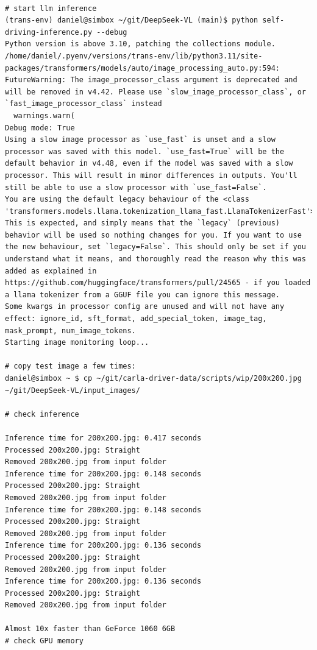 \begin{verbatim}

# start llm inference
(trans-env) daniel@simbox ~/git/DeepSeek-VL (main)$ python self-driving-inference.py --debug
Python version is above 3.10, patching the collections module.
/home/daniel/.pyenv/versions/trans-env/lib/python3.11/site-packages/transformers/models/auto/image_processing_auto.py:594: FutureWarning: The image_processor_class argument is deprecated and will be removed in v4.42. Please use `slow_image_processor_class`, or `fast_image_processor_class` instead
  warnings.warn(
Debug mode: True
Using a slow image processor as `use_fast` is unset and a slow processor was saved with this model. `use_fast=True` will be the default behavior in v4.48, even if the model was saved with a slow processor. This will result in minor differences in outputs. You'll still be able to use a slow processor with `use_fast=False`.
You are using the default legacy behaviour of the <class 'transformers.models.llama.tokenization_llama_fast.LlamaTokenizerFast'>. This is expected, and simply means that the `legacy` (previous) behavior will be used so nothing changes for you. If you want to use the new behaviour, set `legacy=False`. This should only be set if you understand what it means, and thoroughly read the reason why this was added as explained in https://github.com/huggingface/transformers/pull/24565 - if you loaded a llama tokenizer from a GGUF file you can ignore this message.
Some kwargs in processor config are unused and will not have any effect: ignore_id, sft_format, add_special_token, image_tag, mask_prompt, num_image_tokens. 
Starting image monitoring loop...

# copy test image a few times:
daniel@simbox ~ $ cp ~/git/carla-driver-data/scripts/wip/200x200.jpg ~/git/DeepSeek-VL/input_images/

# check inference

Inference time for 200x200.jpg: 0.417 seconds
Processed 200x200.jpg: Straight
Removed 200x200.jpg from input folder
Inference time for 200x200.jpg: 0.148 seconds
Processed 200x200.jpg: Straight
Removed 200x200.jpg from input folder
Inference time for 200x200.jpg: 0.148 seconds
Processed 200x200.jpg: Straight
Removed 200x200.jpg from input folder
Inference time for 200x200.jpg: 0.136 seconds
Processed 200x200.jpg: Straight
Removed 200x200.jpg from input folder
Inference time for 200x200.jpg: 0.136 seconds
Processed 200x200.jpg: Straight
Removed 200x200.jpg from input folder

Almost 10x faster than GeForce 1060 6GB
# check GPU memory


\end{verbatim}
